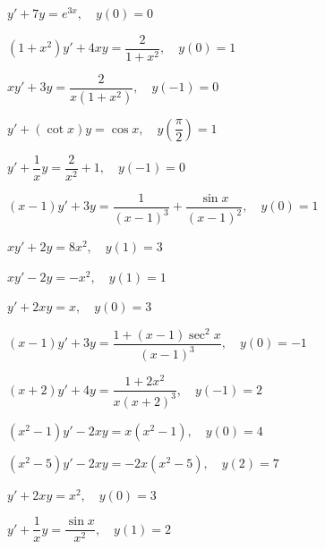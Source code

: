 \begin{exerciselist}
\item\label{exer:2.1.25}\CGex $y'+7y=e^{3x},\quad y(0)=0$

\item\label{exer:2.1.26}\CGex $(1+x^2)y'+4xy=\dfrac{2}{1+x^2},\quad y(0)=1$

\item\label{exer:2.1.27}\CGex $xy'+3y=\dfrac{2}{x(1+x^2)},\quad y(-1)=0$


\item\label{exer:2.1.28}\CGex
$y'+ (\cot x)y=\cos x,\quad y\left(\dfrac{\pi}{2}\right)=1$

\item\label{exer:2.1.29}\CGex $y'+\dfrac{1}{x}y=\dfrac{2}{x^2}+1,\quad y(-1)=0$



\item\label{exer:2.1.30}$(x-1)y'+3y=\dfrac{1}{(x-1)^3} +
\dfrac{\sin x}{(x-1)^2},\quad y(0)=1$

\item\label{exer:2.1.31}$xy'+2y=8x^2,\quad y(1)=3$

\item\label{exer:2.1.32}$xy'-2y=-x^2,\quad y(1)=1$

\item\label{exer:2.1.33}$y'+2xy=x,\quad y(0)=3$

\item\label{exer:2.1.34}$(x-1)y'+3y=\dfrac{1+(x-1)\sec^2x}{(x-1)^3},\quad y(0)=-1$

\item\label{exer:2.1.35}$(x+2)y'+4y=\dfrac{1+2x^2}{x(x+2)^3},\quad y(-1)=2$

\item\label{exer:2.1.36}$(x^2-1)y'-2xy=x(x^2-1),\quad y(0)=4$

\item\label{exer:2.1.37}$(x^2-5)y'-2xy=-2x(x^2-5),\quad y(2)=7$


\item\label{exer:2.1.38}$y'+2xy=x^2,\quad y(0)=3$

\item\label{exer:2.1.39}$y'+\dfrac{1}{x}y=\dfrac{\sin x}{x^2},\quad y(1)=2$


\end{exerciselist}
